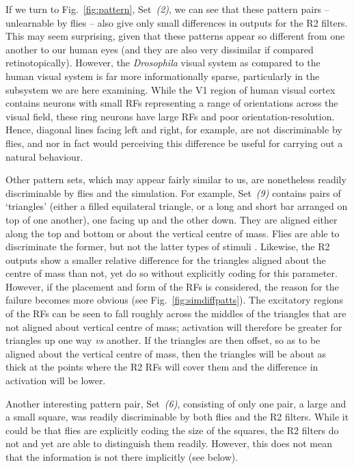If we turn to Fig.~\ref{fig:pattern}, Set~\emph{(2)}, we can see that these pattern pairs -- unlearnable by flies -- also give only small differences in outputs for the R2 filters.
This may seem surprising, given that these patterns appear so different from one another to our human eyes (and they are also very dissimilar if compared retinotopically).
However, the \emph{Drosophila} visual system as compared to the human visual system is far more informationally sparse, particularly in the subsystem we are here examining.
While the V1 region of human visual cortex contains neurons with small RFs representing a range of orientations across the visual field, these ring neurons have large RFs and poor orientation-resolution.
Hence, diagonal lines facing left and right, for example, are not discriminable by flies, and nor in fact would perceiving this difference be useful for carrying out a natural behaviour.

Other pattern sets, which may appear fairly similar to us, are nonetheless readily discriminable by flies and the simulation.
For example, Set~\emph{(9)} contains pairs of `triangles' (either a filled equilateral triangle, or a long and short bar arranged on top of one another), one facing up and the other down.
They are aligned either along the top and bottom or about the vertical centre of mass.
Flies are able to discriminate the former, but not the latter types of stimuli \cite{Ernst1999}.
Likewise, the R2 outputs show a smaller relative difference for the triangles aligned about the centre of mass than not, yet do so without explicitly coding for this parameter.
However, if the placement and form of the RFs is considered, the reason for the failure becomes more obvious (see Fig.~\ref{fig:simdiffpatts}).
The excitatory regions of the RFs can be seen to fall roughly across the middles of the triangles that are not aligned about vertical centre of mass; activation will therefore be greater for triangles up one way \emph{vs} another.
If the triangles are then offset, so as to be aligned about the vertical centre of mass, then the triangles will be about as thick at the points where the R2 RFs will cover them and the difference in activation will be lower.

Another interesting pattern pair, Set~\emph{(6)}, consisting of only one pair, a large and a small square, was readily discriminable by both flies and the R2 filters.
While it could be that flies are explicitly coding the size of the squares, the R2 filters do not and yet are able to distinguish them readily.
However, this does not mean that the information is not there implicitly (see below).

